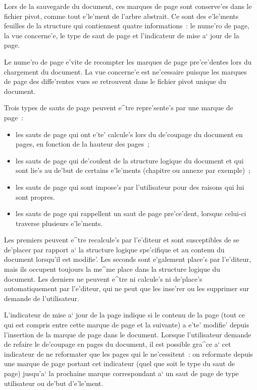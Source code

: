 Lors de la sauvegarde du document, ces marques de page sont conserve'es dans
le fichier pivot, comme tout e'le'ment de l'arbre abstrait. Ce sont des e'le'ments
feuilles de la structure qui contiennent quatre informations~: le nume'ro de
page, la vue concerne'e, le type de saut de page et l'indicateur de mise a`
jour de la page.

Le nume'ro de page e'vite de recompter les marques de page pre'ce'dentes lors
du chargement du document. La vue concerne'e est ne'cessaire puisque les
marques de page des diffe'rentes vues se retrouvent dans le fichier pivot
unique du document.

Trois types de sauts de page peuvent e^tre repre'sente's par une marque de
page~:

\begin{itemize}
\item
les sauts de page qui ont e'te' calcule's lors du de'coupage du document en
pages, en fonction de la hauteur des pages~;
\item
les sauts de page qui de'coulent de la structure logique du document et qui
sont lie's au de'but de certains e'le'ments (chapitre ou annexe par exemple)~;
\item
les sauts de page qui sont impose's par l'utilisateur pour des
raisons qui lui sont propres.
\item
les sauts de page qui rappellent un saut de page pre'ce'dent, lorsque celui-ci
traverse plusieurs e'le'ments.
\end{itemize}

Les premiers peuvent e^tre recalcule's par l'e'diteur et sont susceptibles de
se de'placer par rapport a` la structure logique spe'cifique et au contenu du
document lorsqu'il est modifie'. Les seconds sont e'galement place's par
l'e'diteur, mais ils occupent toujours la me^me place dans la structure logique
du document. Les derniers ne peuvent e^tre ni calcule's ni de'place's
automatiquement par l'e'diteur, qui ne peut que les inse'rer ou les supprimer
sur demande de l'utilisateur.

L'indicateur de mise a` jour de la page indique si le contenu de la page
(tout ce qui est compris entre cette marque de page et la suivante) a e'te'
modifie' depuis l'insertion de la marque de page dans le document. Lorsque
l'utilisateur demande de refaire le de'coupage en pages du document, il est
possible gra^ce a` cet indicateur de ne reformater que les pages qui le
ne'cessitent~: on reformate depuis une marque de page portant cet indicateur
(quel que soit le type du saut de page) jusqu'a` la prochaine marque
correspondant a` un saut de page de type utilisateur ou de'but d'e'le'ment.

